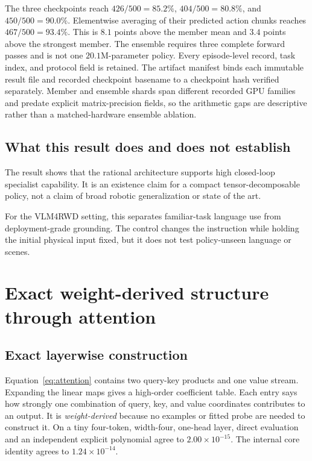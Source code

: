\documentclass{article}
\begin{document}
The three checkpoints reach $426/500=85.2\%$, $404/500=80.8\%$, and $450/500=90.0\%$.
Elementwise averaging of their predicted action chunks reaches $467/500=93.4\%$. This is $8.1$
points above the member mean and $3.4$ points above the strongest member. The ensemble requires
three complete forward passes and is not one $20.1$M-parameter policy. Every episode-level record,
task index, and protocol field is retained. The artifact manifest binds each immutable result file
and recorded checkpoint basename to a checkpoint hash verified separately. Member and ensemble
shards span different recorded GPU families and predate explicit matrix-precision fields, so the
arithmetic gaps are descriptive rather than a matched-hardware ensemble ablation.

\subsection{What this result does and does not establish}

The result shows that the rational architecture supports high closed-loop specialist
capability. It is an existence claim for a compact tensor-decomposable
policy, not a claim of broad robotic generalization or state of the art.





For the VLM4RWD setting, this separates familiar-task language use from deployment-grade grounding.
The control changes the instruction while holding the initial physical input fixed, but it does not
test policy-unseen language or scenes.

\section{Exact weight-derived structure through attention}
\label{sec:exactattention}

\subsection{Exact layerwise construction}

Equation~\ref{eq:attention} contains two query-key products and one value stream. Expanding
the linear maps gives a high-order coefficient table. Each entry says how strongly one
combination of query, key, and value coordinates contributes to an output. It is
\emph{weight-derived} because no examples or fitted probe are needed to construct it. On a
tiny four-token, width-four, one-head layer, direct evaluation
and an independent explicit polynomial agree to $2.00\times10^{-15}$. The internal core
identity agrees to $1.24\times10^{-14}$.
\end{document}
